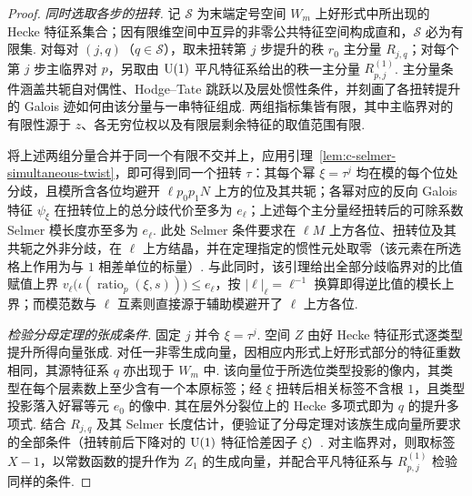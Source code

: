 \begin{proof}
\emph{同时选取各步的扭转.}
记 $\mathcal S$ 为末端定号空间 $W_m$ 上好形式中所出现的 Hecke 特征系集合；因有限维空间中互异的非零公共特征空间构成直和，$\mathcal S$ 必为有限集.
对每对 $(j,q)$（$q\in\mathcal S$），取未扭转第 $j$ 步提升的秩 $r_0$ 主分量 $R_{j,q}$；对每个第 $j$ 步主临界对 $p$，另取由 $\operatorname{U}(1)$ 平凡特征系给出的秩一主分量 $R_{p,j}^{(1)}$.
主分量条件涵盖共轭自对偶性、Hodge--Tate 跳跃以及层处惯性条件，并刻画了各扭转提升的 Galois 迹如何由该分量与一串特征组成.
两组指标集皆有限，其中主临界对的有限性源于 $z$、各无穷位权以及有限层剩余特征的取值范围有限.

将上述两组分量合并于同一个有限不交并上，应用引理~\ref{lem:c-selmer-simultaneous-twist}，即可得到同一个扭转 $\tau$：其每个幂 $\xi=\tau^j$ 均在模的每个位处分歧，且模所含各位均避开 $\ell p_0p_1N$ 上方的位及其共轭；各幂对应的反向 Galois 特征 $\psi_\xi$ 在扭转位上的总分歧代价至多为 $e_\ell$；上述每个主分量经扭转后的可除系数 Selmer 模长度亦至多为 $e_\ell$.
此处 Selmer 条件要求在 $\ell M$ 上方各位、扭转位及其共轭之外非分歧，在 $\ell$ 上方结晶，并在定理指定的惯性元处取零（该元素在所选格上作用为与 $1$ 相差单位的标量）.
与此同时，该引理给出全部分歧临界对的比值赋值上界 $v_\ell\bigl(\iota(\operatorname{ratio}_p(\xi,s))\bigr)\le e_\ell$，按 $|\ell|_\ell=\ell^{-1}$ 换算即得逆比值的模长上界；而模范数与 $\ell$ 互素则直接源于辅助模避开了 $\ell$ 上方各位.

\emph{检验分母定理的张成条件.}
固定 $j$ 并令 $\xi=\tau^j$. 空间 $Z$ 由好 Hecke 特征形式逐类型提升所得向量张成.
对任一非零生成向量，因相应内形式上好形式部分的特征重数相同，其源特征系 $q$ 亦出现于 $W_m$ 中.
该向量位于所选位类型投影的像内，其类型在每个层素数上至少含有一个本原标签；经 $\xi$ 扭转后相关标签不含根 $1$，且类型投影落入好幂等元 $e_0$ 的像中.
其在层外分裂位上的 Hecke 多项式即为 $q$ 的提升多项式.
结合 $R_{j,q}$ 及其 Selmer 长度估计，便验证了分母定理对该族生成向量所要求的全部条件（扭转前后下降对的 $\operatorname{U}(1)$ 特征恰差因子 $\xi$）.
对主临界对，则取标签 $X-1$，以常数函数的提升作为 $Z_1$ 的生成向量，并配合平凡特征系与 $R_{p,j}^{(1)}$ 检验同样的条件.


\end{proof}
